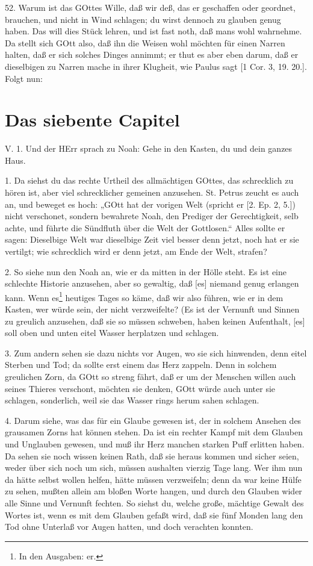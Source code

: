 52. Warum ist das GOttes Wille, daß wir deß, das er geschaffen oder geordnet, brauchen, und nicht in Wind schlagen; du wirst dennoch zu glauben genug haben. Das will dies Stück lehren, und ist fast noth, daß mans wohl wahrnehme. Da stellt sich GOtt also, daß ihn die Weisen wohl möchten für einen Narren halten, daß er sich solches Dinges annimmt; er thut es aber eben darum, daß er dieselbigen zu Narren mache in ihrer Klugheit, wie Paulus sagt [1 Cor. 3, 19. 20.]. Folgt nun:

\section{Das siebente Capitel}

\begin{schriftzitat}
V. 1. Und der HErr sprach zu Noah: Gehe in den Kasten, du und dein ganzes Haus.
\end{schriftzitat}

1. Da siehst du das rechte Urtheil des allmächtigen GOttes, das schrecklich zu hören ist, aber viel schrecklicher gemeinen anzusehen. St. Petrus zeucht es auch an, und beweget es hoch: „GOtt hat der vorigen Welt (spricht er [2. Ep. 2, 5.]) nicht verschonet, sondern bewahrete Noah, den Prediger der Gerechtigkeit, selb achte, und führte die Sündfluth über die Welt der Gottlosen.“ Alles sollte er sagen: Dieselbige Welt war dieselbige Zeit viel besser denn jetzt, noch hat er sie vertilgt; wie schrecklich wird er denn jetzt, am Ende der Welt, strafen?

2. So siehe nun den Noah an, wie er da mitten in der Hölle steht. Es ist eine schlechte Historie anzusehen, aber so gewaltig, daß [es] niemand genug erlangen kann. Wenn es\footnote{In den Ausgaben: er.} heutiges Tages so käme, daß wir also führen, wie er in dem Kasten, wer würde sein, der nicht verzweifelte? (Es ist der Vernunft und Sinnen zu greulich anzusehen, daß sie so müssen schweben, haben keinen Aufenthalt, [es] soll oben und unten eitel Wasser herplatzen und schlagen.

3. Zum andern sehen sie dazu nichts vor Augen, wo sie sich hinwenden, denn eitel Sterben und Tod; da sollte erst einem das Herz zappeln. Denn in solchem greulichen Zorn, da GOtt so streng fährt, daß er um der Menschen willen auch seines Thieres verschont, möchten sie denken, GOtt würde auch unter sie schlagen, sonderlich, weil sie das Wasser rings herum sahen schlagen.

4. Darum siehe, was das für ein Glaube gewesen ist, der in solchem Ansehen des grausamen Zorns hat können stehen. Da ist ein rechter Kampf mit dem Glauben und Unglauben gewesen, und muß ihr Herz manchen starken Puff erlitten haben. Da sehen sie noch wissen keinen Rath, daß sie heraus kommen und sicher seien, weder über sich noch um sich, müssen aushalten vierzig Tage lang. Wer ihm nun da hätte selbst wollen helfen, hätte müssen verzweifeln; denn da war keine Hülfe zu sehen, mußten allein am bloßen Worte hangen, und durch den Glauben wider alle Sinne und Vernunft fechten. So siehst du, welche große, mächtige Gewalt des Wortes ist, wenn es mit dem Glauben gefaßt wird, daß sie fünf Monden lang den Tod ohne Unterlaß vor Augen hatten, und doch verachten konnten.

